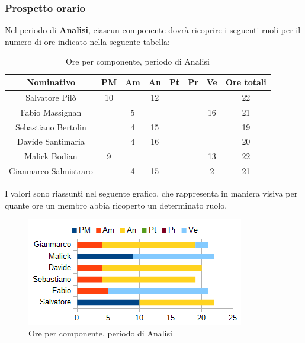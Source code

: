 		\subsubsection{Prospetto orario}
		Nel periodo di \textbf{Analisi}, ciascun componente dovrà ricoprire i seguenti ruoli per il numero di ore indicato nella seguente tabella: \\
		\begin{table}[H]
		\centering
		\begin{tabular}{|c|c|c|c|c|c|c|c|}
			\hline
			\textbf{Nominativo}		& \textbf{PM}	& \textbf{Am}	& \textbf{An}	& \textbf{Pt}	& \textbf{Pr}	& \textbf{Ve}	& \textbf{Ore totali}     \\
			\hline
			Salvatore Pilò			& 10	& 		& 12	&		&		&		& 22 \\
			Fabio Massignan			&		& 5		&		&		&		& 16	& 21 \\
			Sebastiano Bertolin		&		& 4		& 15	&		&		&		& 19 \\
			Davide Santimaria		&		& 4		& 16	&		&		&		& 20 \\
			Malick Bodian			& 9		&		&		&		&		& 13	& 22 \\
			Gianmarco Salmistraro	&		& 4		& 15	&		&		& 2		& 21 \\
			\hline
		\end{tabular}
		\caption{Ore per componente, periodo di Analisi}
		\end{table}
		I valori sono riassunti nel seguente grafico, che rappresenta in maniera visiva per quante ore un membro abbia ricoperto un determinato ruolo. \\
		\begin{figure}[H]
			\centering
			\includegraphics[scale=1]{immagini/grafici/analisi-barra.png}
			\caption{Ore per componente, periodo di Analisi}
		\end{figure}
